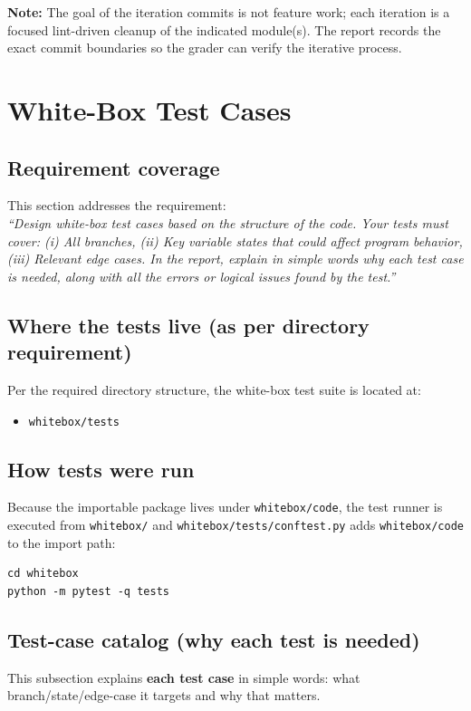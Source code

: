 \documentclass[11pt,a4paper]{article}
\begin{document}
\noindent\textbf{Note:} The goal of the iteration commits is not feature work; each iteration is a focused lint-driven cleanup of the indicated module(s). The report records the exact commit boundaries so the grader can verify the iterative process.

\section{White-Box Test Cases}
\label{sec:whitebox}

\subsection{Requirement coverage}
This section addresses the requirement:\\
\textit{``Design white-box test cases based on the structure of the code. Your tests must cover: (i) All branches, (ii) Key variable states that could affect program behavior, (iii) Relevant edge cases. In the report, explain in simple words why each test case is needed, along with all the errors or logical issues found by the test.''}

\subsection{Where the tests live (as per directory requirement)}
Per the required directory structure, the white-box test suite is located at:
\begin{itemize}[leftmargin=*]
  \item \texttt{whitebox/tests}
\end{itemize}

\subsection{How tests were run}
Because the importable package lives under \texttt{whitebox/code}, the test runner is executed from \texttt{whitebox/} and \texttt{whitebox/tests/conftest.py} adds \texttt{whitebox/code} to the import path:

\begin{verbatim}
cd whitebox
python -m pytest -q tests
\end{verbatim}

\subsection{Test-case catalog (why each test is needed)}
This subsection explains \textbf{each test case} in simple words: what branch/state/edge-case it targets and why that matters.
\end{document}
